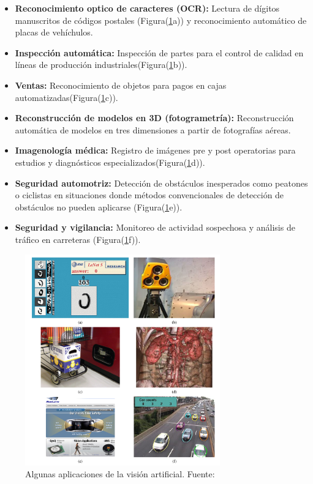 \begin{itemize}
    \item \textbf{Reconocimiento optico de caracteres (OCR):} Lectura de dígitos manuscritos de códigos postales (Figura(\ref{fig:cvision}a)) y reconocimiento automático de placas de vehíchulos.
    \item \textbf{Inspección automática:} Inspección de partes para el control de calidad en líneas de producción industriales(Figura(\ref{fig:cvision}b)).
    \item \textbf{Ventas:} Reconocimiento de objetos para pagos en cajas automatizadas(Figura(\ref{fig:cvision}c)).
    \item \textbf{Reconstrucción de modelos en 3D (fotogrametría):} Reconstrucción automática de modelos en tres dimensiones a partir de fotografías aéreas.
    \item \textbf{Imagenología médica:}  Registro de imágenes pre y post operatorias para estudios y diagnósticos especializados(Figura(\ref{fig:cvision}d)).
    \item \textbf{Seguridad automotriz:} Detección de obstáculos inesperados como peatones o ciclistas en situaciones donde métodos convencionales de detección de obstáculos no pueden aplicarse (Figura(\ref{fig:cvision}e)).
    \item \textbf{Seguridad y vigilancia:} Monitoreo de actividad sospechosa y análisis de tráfico en carreteras (Figura(\ref{fig:cvision}f)).
\end{itemize}


\begin{figure}[!h] 
    \centering
    \includegraphics[width=0.75\textwidth]{img/cvision}
    \caption[Algunas aplicaciones de la visión artificial]{Algunas aplicaciones de la visión artificial. Fuente: \cite{Szeliski2011} }
    \label{fig:cvision}
\end{figure}

